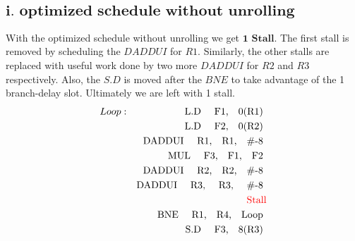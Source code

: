 \documentclass{tufte-handout}
\begin{document}
  	\subsection{$\textbf{i.\ optimized schedule without unrolling}$}
  	With the optimized schedule without unrolling we get $\textbf{1 Stall}$. The first stall is removed by scheduling the $DADDUI$ for $R1$. Similarly, the other stalls are replaced with useful work done by two more $DADDUI$ for $R2$ and $R3$ respectively. Also, the $S.D$ is moved after the $BNE$ to take advantage of the 1 branch-delay slot. Ultimately we are left with 1 stall.
		\begin{eqnarray*}
			Loop : & & \mbox{L.D \quad F1,\quad0(R1) }\\
			       & & \mbox{L.D \quad F2,\quad 0(R2) }\\
				   & & \mbox{DADDUI \quad R1,\quad R1,\quad \#-8  }\\
				   & & \mbox{MUL \quad F3,\quad F1,\quad F2  }\\
				   & & \mbox{DADDUI \quad R2,\quad R2,\quad \#-8  }\\
				   & & \mbox{DADDUI \quad R3, \quad R3, \quad \#-8  }\\
				   & & \mbox{\textcolor{red}{Stall}}\\
				   & & \mbox{BNE \quad R1,\quad R4,\quad Loop } \\
				   & & \mbox{S.D \quad F3,\quad 8(R3) } \\
		\end{eqnarray*}
\end{document}
